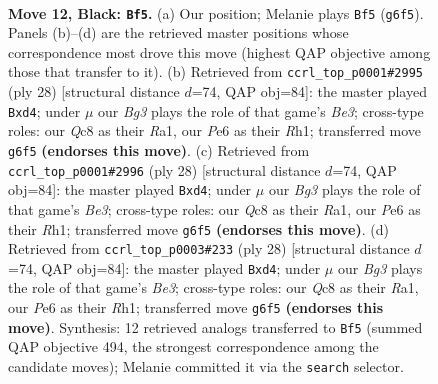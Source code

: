 \documentclass[11pt]{article}
\begin{document}
\clearpage

\begin{figure}[p]\centering
\begin{subfigure}{0.46\textwidth}\centering
\resizebox{\linewidth}{!}{%
\newchessgame
\chessboard[
  setfen={rnq1kb1r/p4pp1/2p1pnbp/2P4P/pP1P1P2/6N1/6P1/R1BQKBNR b KQkq - 0 12},
  showmover=false,
  pgfstyle=straightmove, color=movearrow, markmove={g6-f5}
]}
\caption{}
\end{subfigure}\hfill
\begin{subfigure}{0.46\textwidth}\centering
\resizebox{\linewidth}{!}{%
\newchessgame
\chessboard[
  setfen={1rbq1rk1/5pb1/p1pp1np1/7p/2PpP2P/2N1BP2/PP1Q2P1/R3KB1R w KQ - 0 15},
  showmover=false,
  pgfstyle=straightmove, color=movearrow, markmove={e3-d4}
]}
\caption{}
\end{subfigure}
\\[4pt]
\begin{subfigure}{0.46\textwidth}\centering
\resizebox{\linewidth}{!}{%
\newchessgame
\chessboard[
  setfen={1rbq1rk1/5pb1/p1pp1np1/7p/2PpP2P/2N1BP2/PP1Q2P1/R3KB1R w KQ - 0 15},
  showmover=false,
  pgfstyle=straightmove, color=movearrow, markmove={e3-d4}
]}
\caption{}
\end{subfigure}\hfill
\begin{subfigure}{0.46\textwidth}\centering
\resizebox{\linewidth}{!}{%
\newchessgame
\chessboard[
  setfen={1rbq1rk1/5pb1/p1pp1np1/7p/2PpP2P/2N1BP2/PP1Q2P1/R3KB1R w KQ - 0 15},
  showmover=false,
  pgfstyle=straightmove, color=movearrow, markmove={e3-d4}
]}
\caption{}
\end{subfigure}
\caption{\textbf{Move 12, Black: \texttt{Bf5}.} (a) Our position; Melanie plays \texttt{Bf5} (\texttt{g6f5}). Panels (b)--(d) are the retrieved master positions whose correspondence most drove this move (highest QAP objective among those that transfer to it). (b) Retrieved from \texttt{ccrl\_top\_p0001\#2995} (ply 28) [structural distance $d$=74, QAP obj=84]: the master played \texttt{Bxd4}; under $\mu$ our \emph{Bg3} plays the role of that game's \emph{Be3}; cross-type roles: our \emph{Q}c8 as their \emph{R}a1, our \emph{P}e6 as their \emph{R}h1; transferred move \texttt{g6f5} \textbf{(endorses this move)}. (c) Retrieved from \texttt{ccrl\_top\_p0001\#2996} (ply 28) [structural distance $d$=74, QAP obj=84]: the master played \texttt{Bxd4}; under $\mu$ our \emph{Bg3} plays the role of that game's \emph{Be3}; cross-type roles: our \emph{Q}c8 as their \emph{R}a1, our \emph{P}e6 as their \emph{R}h1; transferred move \texttt{g6f5} \textbf{(endorses this move)}. (d) Retrieved from \texttt{ccrl\_top\_p0003\#233} (ply 28) [structural distance $d$=74, QAP obj=84]: the master played \texttt{Bxd4}; under $\mu$ our \emph{Bg3} plays the role of that game's \emph{Be3}; cross-type roles: our \emph{Q}c8 as their \emph{R}a1, our \emph{P}e6 as their \emph{R}h1; transferred move \texttt{g6f5} \textbf{(endorses this move)}. Synthesis: 12 retrieved analogs transferred to \texttt{Bf5} (summed QAP objective 494, the strongest correspondence among the candidate moves); Melanie committed it via the \texttt{search} selector.}
\label{fig:thought-m23}
\end{figure}
\end{document}

